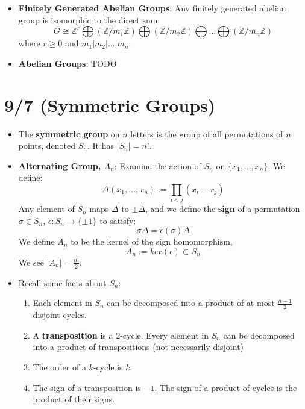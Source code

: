 \documentclass[11pt, oneside]{amsart}   	%
\theoremstyle{definition}
\begin{document}
\begin{itemize}
	\item \textbf{Finitely Generated Abelian Groups}: Any finitely generated abelian group is isomorphic to the direct sum:
	$$
		G\cong \mathbb Z^r \bigoplus (\mathbb Z/m_1\mathbb Z)\bigoplus (\mathbb Z/m_2\mathbb Z) \bigoplus ... \bigoplus (\mathbb Z/m_n\mathbb 
		Z)
	$$
	where $r\geq 0$ and $m_1 | m_2 | ... | m_n$.
	
	\item \textbf{Abelian Groups}: TODO

\end{itemize}

\section{9/7 (Symmetric Groups)}

\begin{itemize}

	\item The \textbf{symmetric group} on $n$ letters is the group of all permutations of $n$ points, denoted $S_n$. It has $|S_n| = n!$.
	
	\item \textbf{Alternating Group, $A_n$}: Examine the action of $S_n$ on $\{x_1, ..., x_n\}$. We define:
	$$
		\Delta(x_1, ..., x_n) := \prod_{i < j}(x_i - x_j)
	$$
	Any element of $S_n$ maps $\Delta$ to $\pm\Delta$, and we define the \textbf{sign} of a permutation $\sigma\in S_n$, $\epsilon:S_n\rightarrow 
	\{\pm 1\}$ to satisfy:
	$$
		\sigma\Delta = \epsilon(\sigma)\Delta
	$$
	We define $A_n$ to be the kernel of the sign homomorphism,
	$$
		A_n := ker(\epsilon)\subset S_n
	$$
	We see $|A_n| = \frac{n!}{2}$.
	
	\item Recall some facts about $S_n$:
		
		\begin{enumerate}
		
			\item Each element in $S_n$ can be decomposed into a product of at most $\frac{n - 1}{2}$ disjoint cycles.
			
			\item A \textbf{transposition} is a 2-cycle. Every element in $S_n$ can be decomposed into a product of transpositions (not necessarily 
			disjoint)
			
			\item The order of a $k$-cycle is $k$.
			
			\item The sign of a transposition is $-1$. The sign of a product of cycles is the product of their signs.
			

\end{enumerate}
\end{itemize}
\end{document}
